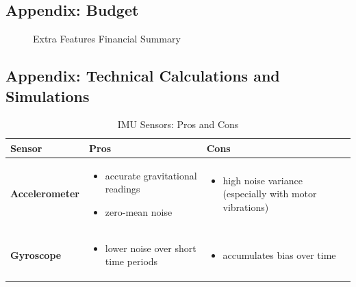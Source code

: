 \documentclass{article}
\begin{document}
\subsection{Appendix: Budget}

\begin{figure}[H]
    \centering
    {\setlength{\fboxsep}{0pt}}
    \caption{Extra Features Financial Summary}
    \label{fig:financials}
\end{figure}

\subsection{Appendix: Technical Calculations and Simulations}

\begin{table}[H]
    \centering
    \label{tab:imu_sensors}
    \begin{tabularx}{\textwidth}{|l|X|X|}
    \hline
    \textbf{Sensor} & \textbf{Pros} & \textbf{Cons} \\
    \hline
    \textbf{Accelerometer} &
    \begin{itemize}
        \item accurate gravitational readings
        \item zero-mean noise
    \end{itemize} &
    \begin{itemize}
        \item high noise variance (especially with motor vibrations)
    \end{itemize} \\
    \hline
    \textbf{Gyroscope} &
    \begin{itemize}
        \item lower noise over short time periods
    \end{itemize} &
    \begin{itemize}
        \item accumulates bias over time
    \end{itemize} \\
    \hline
    \end{tabularx}
    \caption{IMU Sensors: Pros and Cons}
\end{table}
\end{document}
